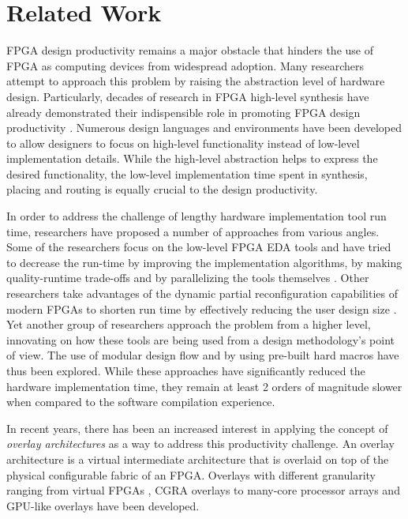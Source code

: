 \section{Related Work}\label{sec:relatedwork}
FPGA design productivity remains a major obstacle that hinders the use of FPGA as computing devices from widespread adoption. Many researchers attempt to approach this problem by raising the abstraction level of hardware design. Particularly, decades of research in FPGA high-level synthesis have already demonstrated their indispensible role in promoting FPGA design productivity \cite{cong2011high}. Numerous design languages and environments \cite{cardoso2010compiling} have been developed to allow designers to focus on high-level functionality instead of low-level implementation details. While the high-level abstraction helps to express the desired functionality, the low-level implementation time spent in synthesis, placing and routing is equally crucial to the design productivity. 

In order to address the challenge of lengthy hardware implementation tool run time, researchers have proposed a number of approaches from various angles. Some of the researchers focus on the low-level FPGA EDA tools and have tried to decrease the run-time by improving the implementation algorithms, by making quality-runtime trade-offs \cite{mulpuri2001runtime} and by parallelizing the tools themselves \cite{moctar2014parallel, goeders2011deterministic, altera-pc, xilinx-pc}. Other researchers take advantages of the dynamic partial reconfiguration capabilities of modern FPGAs to shorten run time by effectively reducing the user design size \cite{Frangieh2010}. Yet another group of researchers approach the problem from a higher level, innovating on how these tools are being used from a design methodology's point of view.  The use of modular design flow and by using pre-built hard macros \cite{lavin2013improving, korf2011automatic} have thus been explored. While these approaches have significantly reduced the hardware implementation time, they remain at least 2 orders of magnitude slower when compared to the software compilation experience. 

In recent years, there has been an increased interest in applying the concept of \emph{overlay architectures} as a way to address this productivity challenge. An overlay architecture is a virtual intermediate architecture that is overlaid on top of the physical configurable fabric of an FPGA. Overlays with different granularity ranging from virtual FPGAs \cite{zuma2013carl,Grant2011Malibu, Coole2010Intermediate,Koch2013CI}, CGRA overlays \cite{kissler2006dynamically, ferreira2011fpga, shukla2006quku, capalijia2013pipelined, dsp2015cgra} to many-core processor arrays \cite{Lebedev2010, hannig2014invasive, boppu2014compact} and GPU-like overlays \cite{Jeffrey2011potential} have been developed. 

